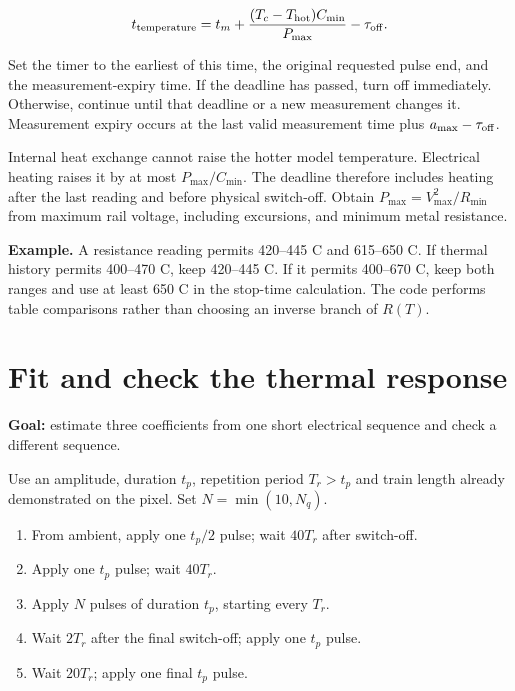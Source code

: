 \documentclass[11pt,letterpaper]{article}
\begin{document}
\[
t_{\rm temperature}=t_m+
\frac{(T_c-T_{\rm hot})C_{\min}}{P_{\max}}-\tau_{\rm off}.
\]

Set the timer to the earliest of this time, the original requested pulse end, and the measurement-expiry time. If the deadline has passed, turn off immediately. Otherwise, continue until that deadline or a new measurement changes it. Measurement expiry occurs at the last valid measurement time plus \(a_{\max}-\tau_{\rm off}\).

Internal heat exchange cannot raise the hotter model temperature. Electrical heating raises it by at most \(P_{\max}/C_{\min}\). The deadline therefore includes heating after the last reading and before physical switch-off. Obtain \(P_{\max}=V_{\max}^2/R_{\min}\) from maximum rail voltage, including excursions, and minimum metal resistance.

\textbf{Example.} A resistance reading permits 420--445 \textdegree{}C and 615--650 \textdegree{}C. If thermal history permits 400--470 \textdegree{}C, keep 420--445 \textdegree{}C. If it permits 400--670 \textdegree{}C, keep both ranges and use at least 650 \textdegree{}C in the stop-time calculation. The code performs table comparisons rather than choosing an inverse branch of \(R(T)\).

\section{Fit and check the thermal response}

\textbf{Goal:} estimate three coefficients from one short electrical sequence and check a different sequence.

Use an amplitude, duration \(t_p\), repetition period \(T_r>t_p\) and train length already demonstrated on the pixel. Set \(N=\min(10,N_q)\).

\begin{enumerate}[start=1]
\item From ambient, apply one \(t_p/2\) pulse; wait \(40T_r\) after switch-off.
\item Apply one \(t_p\) pulse; wait \(40T_r\).
\item Apply \(N\) pulses of duration \(t_p\), starting every \(T_r\).
\item Wait \(2T_r\) after the final switch-off; apply one \(t_p\) pulse.
\item Wait \(20T_r\); apply one final \(t_p\) pulse.
\end{enumerate}
\end{document}

